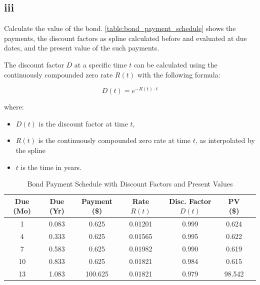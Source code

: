 \documentclass{article}
\begin{document}
\subsection*{iii}
Calculate the value of the bond. \autoref{table:bond_payment_schedule} shows the payments,
the discount factors as spline calculated before and evaluated at due dates,
and the present value of the such payments.

The discount factor \( D \) at a specific time \( t \) can be calculated using the continuously compounded zero rate \( R(t) \) with the following formula:

\[
    D(t) = e^{-R(t) \cdot t}
\]

where:
\begin{itemize}
    \item \( D(t) \) is the discount factor at time \( t \),
    \item \( R(t) \) is the continuously compounded zero rate at time \( t \), as interpolated by the spline
    \item \( t \) is the time in years.
\end{itemize}


\begin{table}[h!]
    \centering
    \small %
    \setlength{\tabcolsep}{4pt} %
    \begin{tabular}{|c|c|c|c|c|c|c|}
        \hline
        \textbf{Due (Mo)} & \textbf{Due (Yr)} & \textbf{Payment (\$)} & \textbf{Rate \( R(t) \)} & \textbf{Disc. Factor \( D(t) \)} & \textbf{PV (\$)} \\
        \hline
        1                 & 0.083             & 0.625                 & 0.01201                  & 0.999                            & 0.624            \\
        4                 & 0.333             & 0.625                 & 0.01565                  & 0.995                            & 0.622            \\
        7                 & 0.583             & 0.625                 & 0.01982                  & 0.990                            & 0.619            \\
        10                & 0.833             & 0.625                 & 0.01821                  & 0.984                            & 0.615            \\
        13                & 1.083             & 100.625               & 0.01821                  & 0.979                            & 98.542           \\
        \hline
    \end{tabular}
    \caption{Bond Payment Schedule with Discount Factors and Present Values}
    \label{table:bond_payment_schedule}
\end{table}
\end{document}
